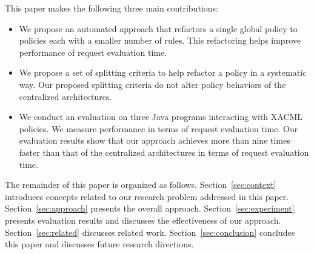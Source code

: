
This paper makes the following three main contributions:
\begin{itemize}
\item We propose an automated approach that refactors a single global policy to policies each with a smaller number of rules. This
refactoring helps improve performance of request evaluation time.
\item We propose a set of splitting criteria to help refactor a policy in a systematic way. Our proposed splitting criteria do not alter policy behaviors of the centralized architectures.
\item We conduct an evaluation on three Java programs interacting with XACML policies. We measure performance in terms
of request evaluation time.
Our evaluation results show that our approach achieves more than nine times faster than that of the centralized architectures in terms of request evaluation time.
\end{itemize}


The remainder of this paper is organized as follows. Section~\ref{sec:context} introduces concepts related to our research problem addressed in this paper.
Section~\ref{sec:approach} presents the overall approach.
Section~\ref{sec:experiment} presents evaluation results and discusses the effectiveness of our approach. Section~\ref{sec:related} discusses related work.
Section~\ref{sec:conclusion} concludes this paper and discusses future research directions.


